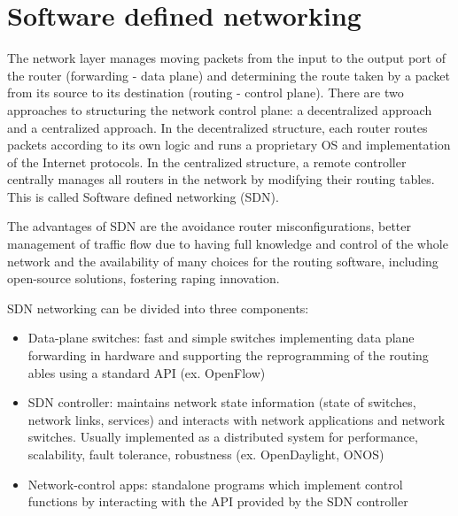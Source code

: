 \chapter{Software defined networking}
The network layer manages moving packets from the input to the output port of the router (forwarding - data plane) and determining the route taken by a packet from its source to its destination (routing - control plane). There are two approaches to structuring the network control plane: a decentralized approach and a centralized approach. In the decentralized structure, each router routes packets according to its own logic and runs a proprietary OS and implementation of the Internet protocols. In the centralized structure, a remote controller centrally manages all routers in the network by modifying their routing tables. This is called Software defined networking (SDN).

The advantages of SDN are the avoidance router misconfigurations, better management of traffic flow due to having full knowledge and control of the whole network and the availability of many choices for the routing software, including open-source solutions, fostering raping innovation.

SDN networking can be divided into three components:
\begin{itemize}
  \item Data-plane switches: fast and simple switches implementing data plane forwarding in hardware and supporting the reprogramming of the routing ables using a standard API (ex. OpenFlow)
  \item SDN controller: maintains network state information (state of switches, network links, services) and interacts with network applications and network switches. Usually implemented as a distributed system for performance, scalability, fault tolerance, robustness (ex. OpenDaylight, ONOS)
  \item Network-control apps: standalone programs which implement control functions by interacting with the API provided by the SDN controller
\end{itemize}


